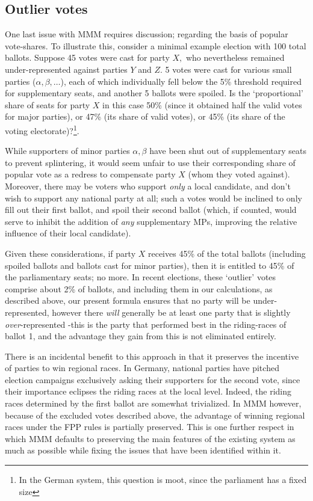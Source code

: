 \documentclass[DIV=calc, paper=a4, fontsize=11pt, twocolumn]{scrartcl}	 %
\begin{document}
\subsection{Outlier votes}
One last issue with MMM requires discussion; regarding the basis of popular vote-shares. To illustrate this, consider a minimal example election with 100 total ballots. Suppose 45 votes were cast for party $X,$ who nevertheless remained under-represented against parties $Y$ and $Z$. 5 votes were cast for various small parties ($\alpha,\beta,\ldots$), each of which individually fell below the 5\% threshold required for supplementary seats, and another 5 ballots were spoiled. 
Is the `proportional' share of seats for party $X$ in this case 50\% (since it obtained half the valid votes for major parties), or 47\% (its share of valid votes), or 45\% (its share of the voting electorate)?\footnote{ In the German system, this question is moot, since the parliament has a fixed size}.

While supporters of minor parties $\alpha,\beta$ have been shut out of supplementary seats to prevent splintering, it would seem unfair to use their corresponding share of popular vote as a redress to compensate party $X$ (whom they voted against). Moreover, there may be voters who support \emph{only} a local candidate, and don't wish to support any national party at all; such a votes would be inclined to only fill out their first ballot, and spoil their second ballot (which, if counted, would serve to inhibit the addition of \emph{any} supplementary MPs, improving the relative influence of their local candidate).

Given these considerations, if party $X$ receives 45\% of the total ballots (including spoiled ballots and ballots cast for minor parties), then it is entitled to 45\% of the parliamentary seats; no more. In recent elections, these `outlier' votes comprise about 2\% of ballots, and including them in our calculations, as described above, our present formula ensures that no party will be under-represented, however there \emph{will} generally be at least one party that is slightly \emph{over}-represented \--this is the party that performed best in the riding-races of ballot 1, and the advantage they gain from this is not eliminated entirely.

There is an incidental benefit to this approach in that it preserves the incentive of parties to win regional races. In Germany, national parties have pitched election campaigns exclusively asking their supporters for the second vote, since their importance eclipses the riding races at the local level. Indeed, the riding races determined by the first ballot are somewhat trivialized.
In MMM however, because of the excluded votes described above, the advantage of winning regional races under the FPP rules is partially preserved. This is one further respect in which MMM defaults to preserving the main features of the existing system as much as possible while fixing the issues that have been identified within it.
\end{document}
